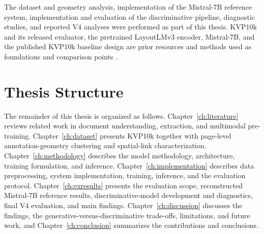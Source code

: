 The dataset and geometry analysis, implementation of the Mistral-7B reference
system, implementation and evaluation of the discriminative pipeline,
diagnostic studies, and reported V4 analyses were performed as part of this
thesis.
KVP10k and its released evaluator, the pretrained LayoutLMv3 encoder,
Mistral-7B, and the published KVP10k baseline design are prior resources and
methods used as foundations and comparison points
\cite{kvp10k,layoutlmv3,mistral}.

\section{Thesis Structure}
\label{sec:structure}

The remainder of this thesis is organized as follows. Chapter~\ref{ch:literature} reviews related work in document understanding, \kvp{} extraction, and multimodal pre-training. Chapter~\ref{ch:dataset} presents KVP10k together with page-level annotation-geometry clustering and spatial-link characterization. Chapter~\ref{ch:methodology} describes the model methodology, architecture, training formulation, and inference. Chapter~\ref{ch:implementation} describes data preprocessing, system implementation, training, inference, and the evaluation protocol. Chapter~\ref{ch:exresults} presents the evaluation scope, reconstructed Mistral-7B reference results, discriminative-model development and diagnostics, final V4 evaluation, and main findings. Chapter~\ref{ch:discussion} discusses the findings, the generative-versus-discriminative trade-offs, limitations, and future work, and Chapter~\ref{ch:conclusion} summarizes the contributions and conclusions.
